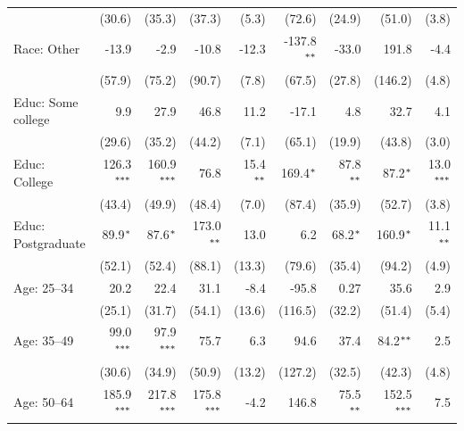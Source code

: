 \begin{table}[!ht]
\begin{adjustbox}{max width=\textwidth}
\begin{tabular}{@{\hspace{0\tabcolsep}}l*{8}{D{.}{.}{-1}}@{\hspace{0\tabcolsep}}}
                              & (30.6)        & (35.3)        & (37.3)        & (5.3)         & (72.6)        & (24.9)        & (51.0)        & (3.8)\\   
      Race: Other             & -13.9         & -2.9          & -10.8         & -12.3         & -137.8$\sym{**}$ & -33.0         & 191.8         & -4.4\\   
                              & (57.9)        & (75.2)        & (90.7)        & (7.8)         & (67.5)        & (27.8)        & (146.2)       & (4.8)\\   
      Educ: Some college      & 9.9           & 27.9          & 46.8          & 11.2          & -17.1         & 4.8           & 32.7          & 4.1\\   
                              & (29.6)        & (35.2)        & (44.2)        & (7.1)         & (65.1)        & (19.9)        & (43.8)        & (3.0)\\   
      Educ: College           & 126.3$\sym{***}$ & 160.9$\sym{***}$ & 76.8          & 15.4$\sym{**}$   & 169.4$\sym{*}$   & 87.8$\sym{**}$   & 87.2$\sym{*}$    & 13.0$\sym{***}$\\   
                              & (43.4)        & (49.9)        & (48.4)        & (7.0)         & (87.4)        & (35.9)        & (52.7)        & (3.8)\\   
      Educ: Postgraduate      & 89.9$\sym{*}$    & 87.6$\sym{*}$    & 173.0$\sym{**}$  & 13.0          & 6.2           & 68.2$\sym{*}$    & 160.9$\sym{*}$   & 11.1$\sym{**}$\\   
                              & (52.1)        & (52.4)        & (88.1)        & (13.3)        & (79.6)        & (35.4)        & (94.2)        & (4.9)\\   
      Age: 25--34             & 20.2          & 22.4          & 31.1          & -8.4          & -95.8         & 0.27          & 35.6          & 2.9\\   
                              & (25.1)        & (31.7)        & (54.1)        & (13.6)        & (116.5)       & (32.2)        & (51.4)        & (5.4)\\   
      Age: 35--49             & 99.0$\sym{***}$  & 97.9$\sym{***}$  & 75.7          & 6.3           & 94.6          & 37.4          & 84.2$\sym{**}$   & 2.5\\   
                              & (30.6)        & (34.9)        & (50.9)        & (13.2)        & (127.2)       & (32.5)        & (42.3)        & (4.8)\\   
      Age: 50--64             & 185.9$\sym{***}$ & 217.8$\sym{***}$ & 175.8$\sym{***}$ & -4.2          & 146.8         & 75.5$\sym{**}$   & 152.5$\sym{***}$ & 7.5\\   

\end{tabular}
\end{adjustbox}
\end{table}
